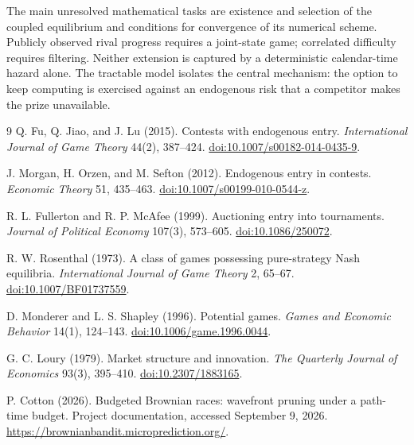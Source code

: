 \documentclass[11pt]{article}
\begin{document}
The main unresolved mathematical tasks are existence and selection of the
coupled equilibrium and conditions for convergence of its numerical scheme.
Publicly observed rival progress requires a joint-state game; correlated
difficulty requires filtering. Neither extension is captured by a
deterministic calendar-time hazard alone. The tractable model isolates the
central mechanism: the option to keep computing is exercised against an
endogenous risk that a competitor makes the prize unavailable.

\begin{thebibliography}{9}
Q. Fu, Q. Jiao, and J. Lu (2015).
Contests with endogenous entry. \emph{International Journal of Game Theory}
44(2), 387--424.
\href{https://doi.org/10.1007/s00182-014-0435-9}{doi:10.1007/s00182-014-0435-9}.

J. Morgan, H. Orzen, and M. Sefton (2012).
Endogenous entry in contests. \emph{Economic Theory} 51, 435--463.
\href{https://doi.org/10.1007/s00199-010-0544-z}{doi:10.1007/s00199-010-0544-z}.

R. L. Fullerton and R. P. McAfee (1999).
Auctioning entry into tournaments. \emph{Journal of Political Economy}
107(3), 573--605.
\href{https://doi.org/10.1086/250072}{doi:10.1086/250072}.

R. W. Rosenthal (1973).
A class of games possessing pure-strategy Nash equilibria.
\emph{International Journal of Game Theory} 2, 65--67.
\href{https://doi.org/10.1007/BF01737559}{doi:10.1007/BF01737559}.

D. Monderer and L. S. Shapley (1996).
Potential games. \emph{Games and Economic Behavior} 14(1), 124--143.
\href{https://doi.org/10.1006/game.1996.0044}{doi:10.1006/game.1996.0044}.

G. C. Loury (1979).
Market structure and innovation. \emph{The Quarterly Journal of Economics}
93(3), 395--410.
\href{https://doi.org/10.2307/1883165}{doi:10.2307/1883165}.

P. Cotton (2026).
Budgeted Brownian races: wavefront pruning under a path-time budget.
Project documentation, accessed September 9, 2026.
\url{https://brownianbandit.microprediction.org/}.
\end{thebibliography}
\end{document}
